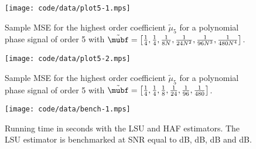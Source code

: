\documentclass[journal]{IEEEtran}
\begin{document}
\begin{figure}[p] 
   	\centering 
  		\texttt{[image: code/data/plot5-1.mps]} 
  		\caption{Sample MSE for the highest order coefficient $\tilde{\mu}_5$ for a polynomial phase signal of order 5 with $\tilde{\mubf} = \left[ \tfrac{1}{4}, \tfrac{1}{4}, \tfrac{1}{8N}, \tfrac{1}{24N^2}, \tfrac{1}{96N^3}, \tfrac{1}{480N^4} \right]$.} 
  		\label{plot:m5} 
\end{figure} 

\begin{figure}[p] 
   	\centering 
  		\texttt{[image: code/data/plot5-2.mps]} 
  		\caption{Sample MSE for the highest order coefficient $\tilde{\mu}_5$ for a polynomial phase signal of order 5 with $\tilde{\mubf} = \left[ \tfrac{1}{4}, \tfrac{1}{4}, \tfrac{1}{8}, \tfrac{1}{24}, \tfrac{1}{96}, \tfrac{1}{480}   \right]$.} 
  		\label{plot:m5big} 
\end{figure} 

\begin{figure}[p] 
   	\centering 
  		\texttt{[image: code/data/bench-1.mps]} 
  		\caption{Running time in seconds with the LSU and HAF estimators.  The LSU estimator is benchmarked at SNR equal to \unit[0]{dB}, \unit[5]{dB}, \unit[10]{dB} and \unit[20]{dB}.} 
  		\label{plot:bench} 
\end{figure} 





\end{document}
